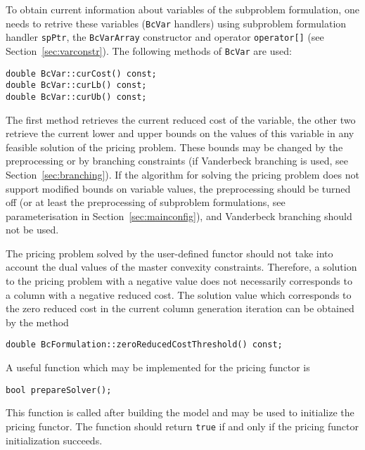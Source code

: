 \documentclass[10pt,a4paper]{article}
\begin{document}
To obtain current information about variables of the subproblem formulation, one needs to retrive these variables
(\verb+BcVar+ handlers) using subproblem formulation handler \verb+spPtr+, the \verb+BcVarArray+ constructor and operator
\verb+operator[]+ (see Section~\ref{sec:varconstr}). The following methods of \verb+BcVar+ are used:
\begin{lstlisting}
double BcVar::curCost() const;
double BcVar::curLb() const;
double BcVar::curUb() const;
\end{lstlisting}
The first method retrieves the current reduced cost of the variable, the other two retrieve the current lower and upper
bounds on the values of this variable in any feasible solution of the pricing problem. These bounds may be changed by the
preprocessing or by branching constraints (if Vanderbeck branching is used, see Section~\ref{sec:branching}). If the
algorithm for solving the pricing problem does not support modified bounds on variable values, the preprocessing should
be turned off (or at least the preprocessing of subproblem formulations, see parameterisation in
Section~\ref{sec:mainconfig}), and Vanderbeck branching should not be used.

The pricing problem solved by the user-defined functor should not take into account the dual values of the master
convexity constraints. Therefore, a solution to the pricing problem with a negative value does not necessarily
corresponds to a column with a negative reduced cost. The solution value which corresponds to the zero reduced cost in
the current column generation iteration can be obtained by the method
\begin{lstlisting}
double BcFormulation::zeroReducedCostThreshold() const;
\end{lstlisting}

A useful function which may be implemented for the pricing functor is 
\begin{lstlisting}
bool prepareSolver();
\end{lstlisting}
This function is called after building the model and may be used to initialize the pricing functor. The function should
return \verb+true+ if and only if the pricing functor initialization succeeds. 
\end{document}
